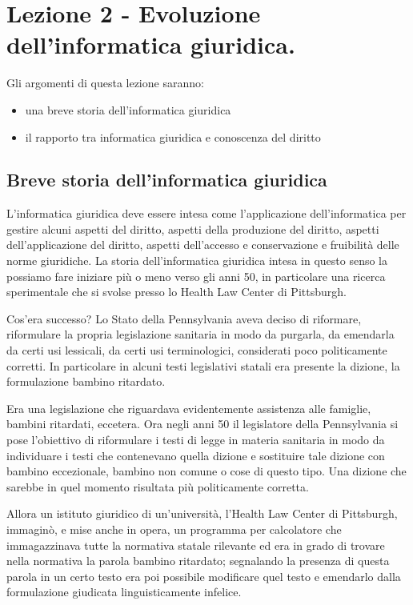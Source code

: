 \chapter{Lezione 2 - Evoluzione dell'informatica giuridica.}
Gli argomenti di questa lezione saranno:
\begin{itemize}
    \item una breve storia dell'informatica giuridica 
    \item il rapporto tra informatica giuridica e conoscenza del diritto 
\end{itemize}

\section{Breve storia dell'informatica giuridica}
L'informatica giuridica deve essere intesa come l'applicazione dell'informatica per gestire alcuni aspetti del diritto, aspetti della produzione del diritto, aspetti dell'applicazione del diritto, aspetti dell'accesso e conservazione e fruibilità delle norme giuridiche. 
La storia dell'informatica giuridica intesa in questo senso la possiamo fare iniziare più o meno verso gli anni 50, in particolare una ricerca sperimentale che si svolse presso lo Health Law Center di Pittsburgh. 

Cos'era successo? Lo Stato della Pennsylvania aveva deciso di riformare, riformulare la propria legislazione sanitaria in modo da purgarla, da emendarla da certi usi lessicali, da certi usi terminologici, considerati poco politicamente corretti. In particolare in alcuni testi legislativi statali era presente la dizione, la formulazione bambino ritardato. 

Era una legislazione che riguardava evidentemente assistenza alle famiglie, bambini ritardati, eccetera. Ora negli anni 50 il legislatore della Pennsylvania si pose l'obiettivo di riformulare i testi di legge in materia sanitaria in modo da individuare i testi che contenevano quella dizione e sostituire tale dizione con bambino eccezionale, bambino non comune o cose di questo tipo. Una dizione che sarebbe in quel momento risultata più politicamente corretta. 

Allora un istituto giuridico di un'università, l'Health Law Center di Pittsburgh, immaginò, e mise anche in opera, un programma per calcolatore che immagazzinava tutte la normativa statale rilevante ed era in grado di trovare nella normativa la parola bambino ritardato; segnalando la presenza di questa parola in un certo testo era poi possibile modificare quel testo e emendarlo dalla formulazione giudicata linguisticamente infelice. 


